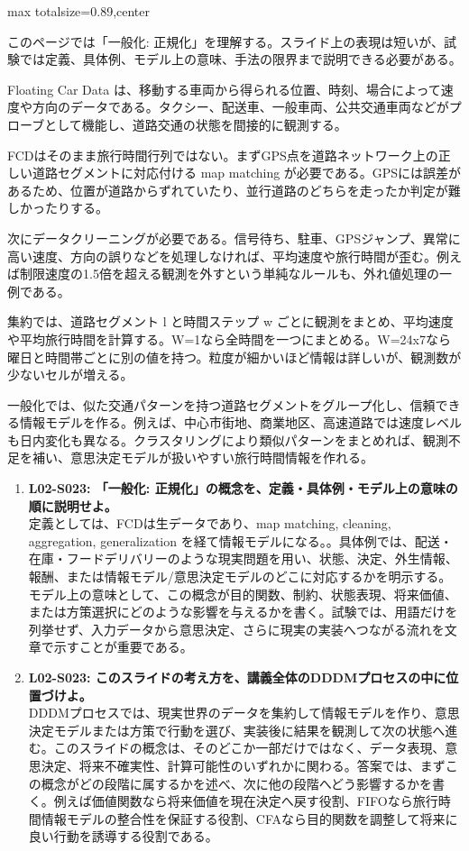 \begin{minipage}[t]{0.58\textwidth}
\begin{adjustbox}{max totalsize={\textwidth}{0.89\textheight},center}
\begin{minipage}{\textwidth}\scriptsize
{}このページでは「一般化: 正規化」を理解する。スライド上の表現は短いが、試験では定義、具体例、モデル上の意味、手法の限界まで説明できる必要がある。\par
Floating Car Data は、移動する車両から得られる位置、時刻、場合によって速度や方向のデータである。タクシー、配送車、一般車両、公共交通車両などがプローブとして機能し、道路交通の状態を間接的に観測する。\par
FCDはそのまま旅行時間行列ではない。まずGPS点を道路ネットワーク上の正しい道路セグメントに対応付ける map matching が必要である。GPSには誤差があるため、位置が道路からずれていたり、並行道路のどちらを走ったか判定が難しかったりする。\par
次にデータクリーニングが必要である。信号待ち、駐車、GPSジャンプ、異常に高い速度、方向の誤りなどを処理しなければ、平均速度や旅行時間が歪む。例えば制限速度の1.5倍を超える観測を外すという単純なルールも、外れ値処理の一例である。\par
集約では、道路セグメント l と時間ステップ w ごとに観測をまとめ、平均速度や平均旅行時間を計算する。W=1なら全時間を一つにまとめる。W=24x7なら曜日と時間帯ごとに別の値を持つ。粒度が細かいほど情報は詳しいが、観測数が少ないセルが増える。\par
一般化では、似た交通パターンを持つ道路セグメントをグループ化し、信頼できる情報モデルを作る。例えば、中心市街地、商業地区、高速道路では速度レベルも日内変化も異なる。クラスタリングにより類似パターンをまとめれば、観測不足を補い、意思決定モデルが扱いやすい旅行時間情報を作れる。\par{}\begin{enumerate}\item \textbf{L02-S023: 「一般化: 正規化」の概念を、定義・具体例・モデル上の意味の順に説明せよ。}\\定義としては、FCDは生データであり、map matching, cleaning, aggregation, generalization を経て情報モデルになる。。具体例では、配送・在庫・フードデリバリーのような現実問題を用い、状態、決定、外生情報、報酬、または情報モデル/意思決定モデルのどこに対応するかを明示する。モデル上の意味として、この概念が目的関数、制約、状態表現、将来価値、または方策選択にどのような影響を与えるかを書く。試験では、用語だけを列挙せず、入力データから意思決定、さらに現実の実装へつながる流れを文章で示すことが重要である。\item \textbf{L02-S023: このスライドの考え方を、講義全体のDDDMプロセスの中に位置づけよ。}\\DDDMプロセスでは、現実世界のデータを集約して情報モデルを作り、意思決定モデルまたは方策で行動を選び、実装後に結果を観測して次の状態へ進む。このスライドの概念は、そのどこか一部だけではなく、データ表現、意思決定、将来不確実性、計算可能性のいずれかに関わる。答案では、まずこの概念がどの段階に属するかを述べ、次に他の段階へどう影響するかを書く。例えば価値関数なら将来価値を現在決定へ戻す役割、FIFOなら旅行時間情報モデルの整合性を保証する役割、CFAなら目的関数を調整して将来に良い行動を誘導する役割である。\end{enumerate}

\end{minipage}
\end{adjustbox}
\end{minipage}
